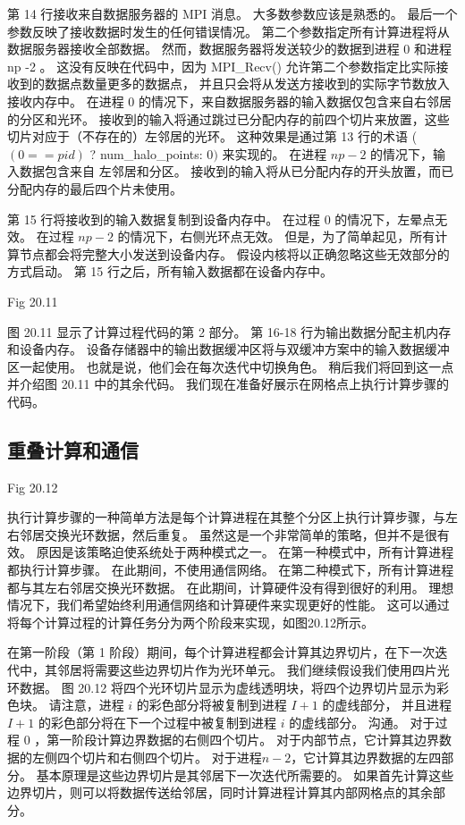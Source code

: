 第 14 行接收来自数据服务器的 MPI 消息。 大多数参数应该是熟悉的。 最后一个参数反映了接收数据时发生的任何错误情况。 
第二个参数指定所有计算进程将从数据服务器接收全部数据。 
然而，数据服务器将发送较少的数据到进程 0 和进程 $\mathrm{np}$ -2 。 
这没有反映在代码中，因为 MPI\_Recv() 允许第二个参数指定比实际接收到的数据点数量更多的数据点，
并且只会将从发送方接收到的实际字节数放入接收内存中。 
在进程 0 的情况下，来自数据服务器的输入数据仅包含来自右邻居的分区和光环。 
接收到的输入将通过跳过已分配内存的前四个切片来放置，这些切片对应于（不存在的）左邻居的光环。 
这种效果是通过第 13 行的术语 ( $(0==p i d)$ ? num\_halo\_points: 0$)$ 来实现的。
在进程 $n p-2$ 的情况下，输入数据包含来自 左邻居和分区。 
接收到的输入将从已分配内存的开头放置，而已分配内存的最后四个片未使用。

第 15 行将接收到的输入数据复制到设备内存中。 在过程 0 的情况下，左晕点无效。 在过程 $n p-2$ 的情况下，右侧光环点无效。 
但是，为了简单起见，所有计算节点都会将完整大小发送到设备内存。 假设内核将以正确忽略这些无效部分的方式启动。 
第 15 行之后，所有输入数据都在设备内存中。

{\color{red} Fig 20.11}

图 20.11 显示了计算过程代码的第 2 部分。 第 16-18 行为输出数据分配主机内存和设备内存。 
设备存储器中的输出数据缓冲区将与双缓冲方案中的输入数据缓冲区一起使用。 
也就是说，他们会在每次迭代中切换角色。 稍后我们将回到这一点并介绍图 20.11 中的其余代码。 
我们现在准备好展示在网格点上执行计算步骤的代码。

\subsection{重叠计算和通信}
{\color{red} Fig 20.12}

执行计算步骤的一种简单方法是每个计算进程在其整个分区上执行计算步骤，与左右邻居交换光环数据，然后重复。 
虽然这是一个非常简单的策略，但并不是很有效。 原因是该策略迫使系统处于两种模式之一。 
在第一种模式中，所有计算进程都执行计算步骤。 在此期间，不使用通信网络。 
在第二种模式下，所有计算进程都与其左右邻居交换光环数据。 在此期间，计算硬件没有得到很好的利用。 
理想情况下，我们希望始终利用通信网络和计算硬件来实现更好的性能。 
这可以通过将每个计算过程的计算任务分为两个阶段来实现，如图20.12所示。

在第一阶段（第 1 阶段）期间，每个计算进程都会计算其边界切片，在下一次迭代中，其邻居将需要这些边界切片作为光环单元。 
我们继续假设我们使用四片光环数据。 图 20.12 将四个光环切片显示为虚线透明块，将四个边界切片显示为彩色块。 
请注意，进程 $i$ 的彩色部分将被复制到进程 $I+1$ 的虚线部分，
并且进程 $I+1$ 的彩色部分将在下一个过程中被复制到进程 $i$ 的虚线部分。 
沟通。 对于过程 0 ，第一阶段计算边界数据的右侧四个切片。 对于内部节点，它计算其边界数据的左侧四个切片和右侧四个切片。 
对于进程$n-2$，它计算其边界数据的左四部分。 基本原理是这些边界切片是其邻居下一次迭代所需要的。 
如果首先计算这些边界切片，则可以将数据传送给邻居，同时计算进程计算其内部网格点的其余部分。

